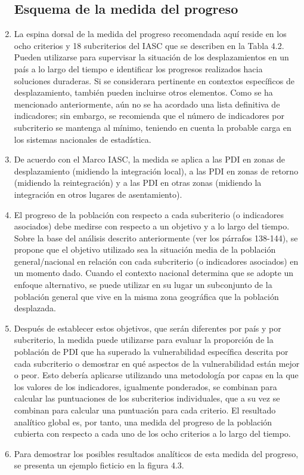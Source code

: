 \documentclass[
]{book}
\begin{document}
\begin{enumerate}
{  \subsection{Esquema de la medida del progreso}\label{esquema-de-la-medida-del-progreso}}
\item
  La espina dorsal de la medida del progreso recomendada aquí reside en los ocho criterios y 18 subcriterios del IASC que se describen en la Tabla 4.2. Pueden utilizarse para supervisar la situación de los desplazamientos en un país a lo largo del tiempo e identificar los progresos realizados hacia soluciones duraderas. Si se considerara pertinente en contextos específicos de desplazamiento, también pueden incluirse otros elementos. Como se ha mencionado anteriormente, aún no se ha acordado una lista definitiva de indicadores; sin embargo, se recomienda que el número de indicadores por subcriterio se mantenga al mínimo, teniendo en cuenta la probable carga en los sistemas nacionales de estadística.
\item
  De acuerdo con el Marco IASC, la medida se aplica a las PDI en zonas de desplazamiento (midiendo la integración local), a las PDI en zonas de retorno (midiendo la reintegración) y a las PDI en otras zonas (midiendo la integración en otros lugares de asentamiento).
\item
  El progreso de la población con respecto a cada subcriterio (o indicadores asociados) debe medirse con respecto a un objetivo y a lo largo del tiempo. Sobre la base del análisis descrito anteriormente (ver los párrafos 138-144), se propone que el objetivo utilizado sea la situación media de la población general/nacional en relación con cada subcriterio (o indicadores asociados) en un momento dado. Cuando el contexto nacional determina que se adopte un enfoque alternativo, se puede utilizar en su lugar un subconjunto de la población general que vive en la misma zona geográfica que la población desplazada.
\item
  Después de establecer estos objetivos, que serán diferentes por país y por subcriterio, la medida puede utilizarse para evaluar la proporción de la población de PDI que ha superado la vulnerabilidad específica descrita por cada subcriterio o demostrar en qué aspectos de la vulnerabilidad están mejor o peor. Esto debería aplicarse utilizando una metodología por capas en la que los valores de los indicadores, igualmente ponderados, se combinan para calcular las puntuaciones de los subcriterios individuales, que a su vez se combinan para calcular una puntuación para cada criterio. El resultado analítico global es, por tanto, una medida del progreso de la población cubierta con respecto a cada uno de los ocho criterios a lo largo del tiempo.
\item
  Para demostrar los posibles resultados analíticos de esta medida del progreso, se presenta un ejemplo ficticio en la figura 4.3.
\end{enumerate}
\end{document}
